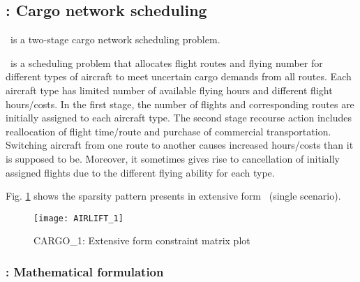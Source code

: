 \subsection{\cargo: Cargo network scheduling} \label{CARGO}
\cargo\ is a two-stage cargo network scheduling problem.  

\airlift\ is a scheduling problem that allocates flight routes and flying number for different types of aircraft to meet uncertain cargo demands from all routes. Each aircraft type has limited number of available flying hours and different flight hours/costs. In the first stage, the number of flights and corresponding routes are initially assigned to each aircraft type. The second stage recourse action includes reallocation of flight time/route and purchase of commercial transportation. Switching aircraft from one route to another causes increased hours/costs than it is supposed to be. Moreover, it sometimes gives rise to cancellation of initially assigned flights due to the different flying ability for each type.    

Fig. \ref{fig:airlift_sparsity} shows the sparsity pattern presents in extensive form \airlift\ (single scenario).
\begin{figure}[H]
	\centering
	\texttt{[image: AIRLIFT\_1]}
	\caption{CARGO\_1: Extensive form constraint matrix plot}
	\label{fig:airlift_sparsity}
\end{figure}
\subsubsection{\cargo: Mathematical formulation}

